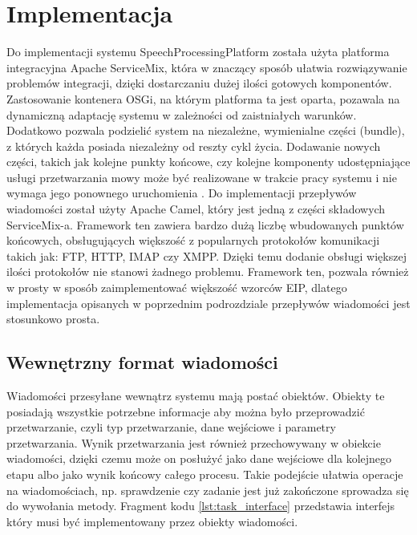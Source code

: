 \section{Implementacja}

Do implementacji systemu SpeechProcessingPlatform została użyta platforma integracyjna Apache ServiceMix, która w znaczący sposób ułatwia rozwiązywanie problemów integracji, dzięki dostarczaniu dużej ilości gotowych komponentów. Zastosowanie kontenera OSGi, na którym platforma ta jest oparta, pozawala na dynamiczną adaptację systemu w zależności od zaistniałych warunków. Dodatkowo pozwala podzielić system na niezależne, wymienialne części (bundle), z których każda posiada niezależny od reszty cykl życia. Dodawanie nowych części, takich jak kolejne punkty końcowe, czy kolejne komponenty udostępniające usługi przetwarzania mowy może być realizowane w trakcie pracy systemu i nie wymaga jego ponownego uruchomienia \cite{hall2011}. Do implementacji przepływów wiadomości został użyty Apache Camel, który jest jedną z części składowych ServiceMix-a. Framework ten zawiera bardzo dużą liczbę wbudowanych punktów końcowych, obsługujących większość z popularnych protokołów komunikacji takich jak: FTP, HTTP, IMAP czy XMPP. Dzięki temu dodanie obsługi większej ilości protokołów nie stanowi żadnego problemu. Framework ten, pozwala również w prosty w sposób zaimplementować większość wzorców EIP, dlatego implementacja opisanych w poprzednim podrozdziale przepływów wiadomości jest stosunkowo prosta.

\subsection{Wewnętrzny format wiadomości}
Wiadomości przesyłane wewnątrz systemu mają postać obiektów. Obiekty te posiadają wszystkie potrzebne informacje aby można było przeprowadzić przetwarzanie, czyli typ przetwarzanie, dane wejściowe i parametry przetwarzania. Wynik przetwarzania jest również przechowywany w obiekcie wiadomości, dzięki czemu może on posłużyć jako dane wejściowe dla kolejnego etapu albo jako wynik końcowy całego procesu. Takie podejście ułatwia operacje na wiadomościach, np. sprawdzenie czy zadanie jest już zakończone sprowadza się do wywołania metody. Fragment kodu \ref{lst:task_interface} przedstawia interfejs który musi być implementowany przez obiekty wiadomości.

\lstset{language=Java, tabsize=4, caption=Definicja interfejsu Task w języku Java.,label=lst:task_interface}

